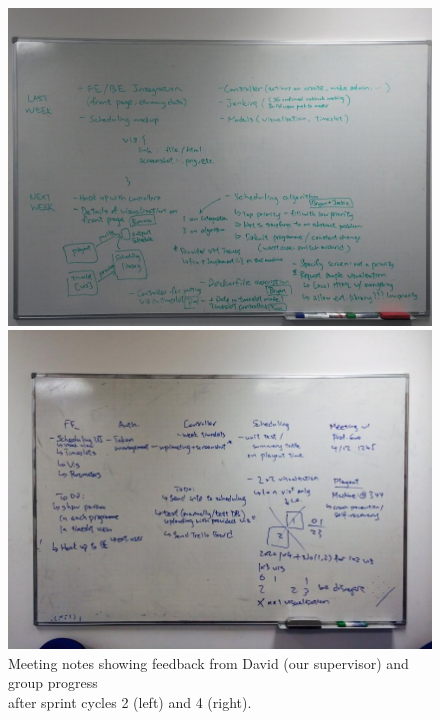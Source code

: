 \documentclass[a4paper]{article}
\begin{document}
\begin{figure}[H]
  \begin{minipage}{0.49\textwidth}
    \includegraphics[width = \textwidth, trim = 0 0.4cm 0 1.6cm, clip]{./evaluation/meeting-board2.jpg}
  \end{minipage}
  \begin{minipage}{0.49\textwidth}
    \includegraphics[width = \textwidth, trim = 1.2cm 1.5cm 1.2cm 2.5cm, clip]{./evaluation/meeting-board.jpg}
  \end{minipage}
  \caption{Meeting notes showing feedback from David (our supervisor) and group progress \\
                    after sprint cycles 2 (left) and 4 (right).}
  \label{fig:meetingboard}
\end{figure}
\end{document}
